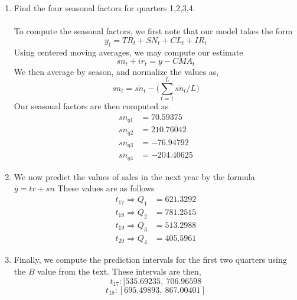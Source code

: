 \documentclass[letterpaper,10pt]{article}
\begin{document}
\begin{enumerate}
\item Find the four seasonal factors for quarters 1,2,3,4.\\\\
To compute the seasonal factors, we first note that our model takes the form
\[y_t=TR_t+SN_t+CL_t+IR_t\]
Using centered moving averages, we may compute our estimate
\[sn_t+ir_t=y-CMA_t\]
We then average by season, and normalize the values as,
\[sn_t=\bar{sn}_t-\bigg(\sum_{t=1}^L\bar{sn}_t/L\bigg)\]
Our seasonal factors are then computed as
\begin{align*}
sn_{q1}&= 70.59375\\
sn_{q2}&= 210.76042\\
sn_{q3}&= -76.94792\\
sn_{q4}&= -204.40625
\end{align*}
\item We now predict the values of sales in the next year by the formula $y=tr+sn$ 
These values are as follows
\begin{align*}
t_{17}\Rightarrow Q_1 &= 621.3292\\
t_{18}\Rightarrow Q_2 &= 781.2515\\
t_{19}\Rightarrow Q_3 &= 513.2988\\
t_{20}\Rightarrow Q_4 &= 405.5961
\end{align*}
\item Finally, we compute the prediction intervals for the first two quarters using the $B$ value from the text. These intervals are then,
\[t_{17}:[535.69235,\ 706.96598\]
\[t_{18}:[695.49893,\ 867.00401]\]
\end{enumerate}
\end{document}
